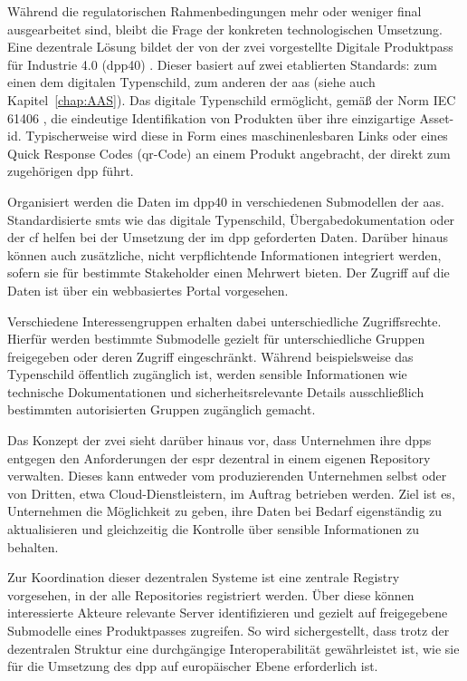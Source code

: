Während die regulatorischen Rahmenbedingungen mehr oder weniger final ausgearbeitet sind, bleibt die Frage der konkreten technologischen Umsetzung.
Eine dezentrale Lösung bildet der von der \acs{zvei} vorgestellte Digitale Produktpass für Industrie 4.0 (\acs{dpp40}) \cite{DPP40}.
Dieser basiert auf zwei etablierten Standards: zum einen dem digitalen Typenschild, zum anderen der \acs{aas} (siehe auch Kapitel~\ref{chap:AAS}).
Das digitale Typenschild ermöglicht, gemäß der Norm IEC 61406 \cite{TypenschildIEC61406-1}, die eindeutige Identifikation von Produkten über ihre einzigartige Asset-\acs{id}.
Typischerweise wird diese in Form eines maschinenlesbaren Links oder eines Quick Response Codes (\acs{qr}-Code) an einem Produkt angebracht, der direkt zum zugehörigen \acs{dpp} führt.

\clearpage
Organisiert werden die Daten im \acs{dpp40} in verschiedenen Submodellen der \acs{aas}. 
Standardisierte \acsp{smt} wie das digitale Typenschild, Übergabedokumentation oder der \acs{cf} helfen bei der Umsetzung der im \acs{dpp} geforderten Daten.
Darüber hinaus können auch zusätzliche, nicht verpflichtende Informationen integriert werden, sofern sie für bestimmte 
\linebreak
Stakeholder einen Mehrwert bieten.
Der Zugriff auf die Daten ist über ein webbasiertes Portal vorgesehen. 

Verschiedene Interessengruppen erhalten dabei unterschiedliche Zugriffsrechte. 
Hierfür werden bestimmte Submodelle gezielt für unterschiedliche Gruppen freigegeben oder deren Zugriff eingeschränkt. 
Während beispielsweise das Typenschild öffentlich zugänglich ist, werden sensible Informationen wie technische Dokumentationen und sicherheitsrelevante Details ausschließlich bestimmten autorisierten Gruppen zugänglich gemacht.

Das Konzept der \acs{zvei} sieht darüber hinaus vor, dass Unternehmen ihre \acsp{dpp} entgegen den Anforderungen der \acs{espr} dezentral in einem eigenen Repository verwalten. 
Dieses kann entweder vom produzierenden Unternehmen selbst oder von Dritten, etwa Cloud-Dienstleistern, im Auftrag betrieben werden. 
Ziel ist es, Unternehmen die Möglichkeit zu geben, ihre Daten bei Bedarf eigenständig zu aktualisieren und gleichzeitig die Kontrolle über sensible Informationen zu behalten.

Zur Koordination dieser dezentralen Systeme ist eine zentrale Registry vorgesehen, in der alle Repositories registriert werden.
Über diese können interessierte Akteure relevante Server identifizieren und gezielt auf freigegebene Submodelle eines Produktpasses zugreifen.
So wird sichergestellt, dass trotz der dezentralen Struktur eine durchgängige Interoperabilität gewährleistet ist, wie sie für die Umsetzung des \acs{dpp} auf europäischer Ebene erforderlich ist.

